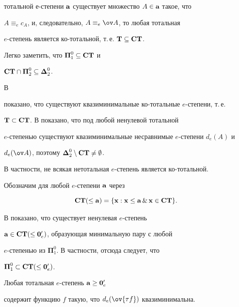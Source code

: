 тотальной $е$-степени ${\bold a}$ существует множество $A\in{\bold a}$ такое, что


$A\equiv_ec_A$, и, следовательно, $A\equiv_e\ov A$, то любая тотальная


$e$-степень является ко-тотальной, т.\,е. ${\bold T}\subseteq\bold{CT}$.


Легко заметить, что ${\boldsymbol\Pi}_1^0\subseteq\bold{CT}$ и


$\bold{CT}\cap{\boldsymbol\Pi}_2^0\subseteq{\boldsymbol\Delta}_2^0$.


В \cite{r2}


показано, что существуют квазиминимальные ко-тотальные $e$-степени, т.\,е.


${\bold T}\subset\bold{CT}$. В \cite{r1} показано, что под любой ненулевой тотальной


$e$-степенью существуют квазиминимальные несравнимые $e$-степени $d_e(A)$ и


$d_e(\ov A)$, поэтому ${\boldsymbol\Delta}_2^0\setminus\bold{CT}\neq\emptyset$.


В частности, не всякая нетотальная $e$-степень является ко-тотальной.





Обозначим для любой $e$-степени ${\bold a}$ через


$$


\bold{CT}(\leq{\bold a})=\{{\bold x}:{\bold x}\leq{\bold a}\,\&\,


{\bold x}\in\bold{CT}\}.


$$


В \cite{r6} показано, что существует ненулевая $e$-степень


${\bold a}\in\bold{CT}(\leq{\bold 0}_e')$, образующая минимальную пару с любой


$e$-степенью из ${\boldsymbol\Pi}_1^0$. В частности, отсюда следует, что


${\boldsymbol\Pi}_1^0\subset\bold{CT}(\leq{\bold 0}_e')$.








\begin{thm}


Любая тотальная $e$-степень ${\bold a}\geq{\bold 0}_e'$


содержит функцию $f$ такую, что $d_e(\ov{\tau f})$ квазиминимальна.


\end{thm}





